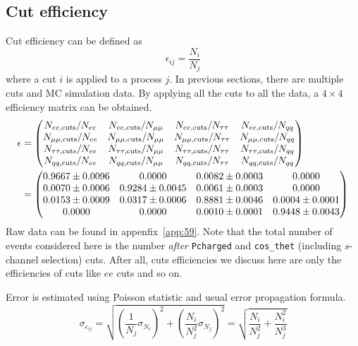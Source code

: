 \subsection{Cut efficiency}
Cut efficiency can be defined as
\begin{equation}
	\epsilon_{ij} = \frac{N_i}{N_j}
\end{equation}
where a cut $i$ is applied to a process $j$. In previous sections, there are multiple cuts and MC simulation data. By applying all the cuts to all the data, a $4\times4$ efficiency matrix can be obtained.
\begin{align}
	\mathbf{\epsilon} &= \begin{pmatrix} N_{ee, \text{cuts}}/N_{ee} & N_{ee, \text{cuts}}/N_{\mu\mu} & N_{ee, \text{cuts}}/N_{\tau\tau} & N_{ee, \text{cuts}}/N_{qq} \\ 
	N_{\mu\mu, \text{cuts}}/N_{ee} & N_{\mu\mu, \text{cuts}}/N_{\mu\mu} & N_{\mu\mu, \text{cuts}}/N_{\tau\tau} & N_{\mu\mu, \text{cuts}}/N_{qq} \\ 
	N_{\tau\tau, \text{cuts}}/N_{ee} & N_{\tau\tau, \text{cuts}}/N_{\mu\mu} & N_{\tau\tau, \text{cuts}}/N_{\tau\tau}  &N_{\tau\tau, \text{cuts}}/N_{qq} \\ 
	N_{qq, \text{cuts}}/N_{ee} & N_{qq, \text{cuts}}/N_{\mu\mu} & N_{qq, \text{cuts}}/N_{\tau\tau}  &N_{qq, \text{cuts}}/N_{qq} 
\end{pmatrix} \label{math:epsFor}\\
							&= \begin{pmatrix} \num{0.9667 +- 0.0096} & \num{0.0000 +- 0.0000} & \num{0.0082 +- 0.0003} & \num{0.0000 +- 0.0000} \\ 
								\num{0.0070 +- 0.0006} & \num{0.9284 +- 0.0045} & \num{0.0061 +- 0.0003} & \num{0.0000 +- 0.0000} \\
								\num{0.0153 +- 0.0009} & \num{0.0317 +- 0.0006} & \num{0.8881 +- 0.0046} & \num{0.0004 +- 0.0001} \\
								\num{0.0000 +- 0.0000} & \num{0.0000 +- 0.0000} & \num{0.0010 +- 0.0001} & \num{0.9448 +- 0.0043} 
	\end{pmatrix}\notag
\end{align}
Raw data can be found in appenfix~\ref{app:59}. Note that the total number of events considered here is the number \textit{after} \verb|Pcharged| and \verb|cos_thet| (including $s$-channel selection) cuts. After all, cuts efficiencies we discuss here are only the efficiencies of cuts like $ee$ cuts and so on.

Error is estimated using Poisson statistic and usual error propagation formula. 
\begin{equation*}
	\sigma_{\epsilon_{ij}} = \sqrt{ \left(\frac{1}{N_j} \sigma_{N_i} \right)^2 + \left(\frac{N_i}{N_j^2} \sigma_{N_j}\right)^2  }  = \sqrt{ \frac{N_i}{N_j^2} + \frac{N_i^2}{N_j^3} }
\end{equation*}

